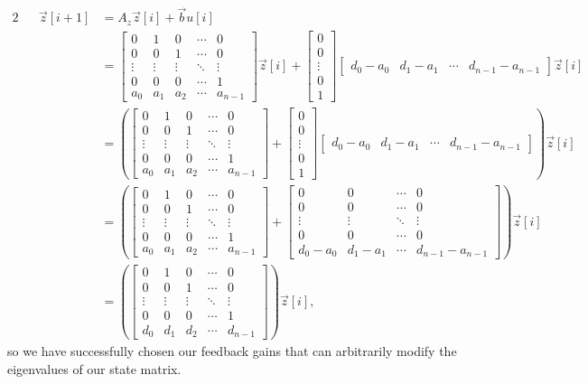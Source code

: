 \documentclass[letterpaper]{article}
\theoremstyle{remark}
\newcommand{\mat}[1]{\ensuremath{\begin{bmatrix}#1\end{bmatrix}}}
\newcommand{\eqn}[1]{\begin{alignat*}{2}#1\end{alignat*}}
\begin{document}
\eqn{
    && \vec{z}[i + 1] &= A_z \vec{z}[i] + \vec{b}u[i] \\
    &&&= \mat{
    0 & 1 & 0 & \cdots & 0 \\ 
    0 & 0 & 1 & \cdots & 0 \\
    \vdots & \vdots & \vdots & \ddots & \vdots \\
    0 & 0 & 0 & \cdots & 1 \\
    a_0 & a_1 & a_2 & \cdots & a_{n - 1}
    } \vec{z}[i] + \mat{0 \\ 0 \\ \vdots \\ 0 \\ 1} \mat{d_0 - a_0 & d_1 - a_1 & \cdots & d_{n-1} - a_{n-1}} \vec{z}[i] \\
    &&&= \left(
    \mat{
    0 & 1 & 0 & \cdots & 0 \\ 
    0 & 0 & 1 & \cdots & 0 \\
    \vdots & \vdots & \vdots & \ddots & \vdots \\
    0 & 0 & 0 & \cdots & 1 \\
    a_0 & a_1 & a_2 & \cdots & a_{n - 1}
    } + \mat{0 \\ 0 \\ \vdots \\ 0 \\ 1} \mat{d_0 - a_0 & d_1 - a_1 & \cdots & d_{n-1} - a_{n-1}} \right) \vec{z}[i]\\
    &&&= \left(
    \mat{
    0 & 1 & 0 & \cdots & 0 \\ 
    0 & 0 & 1 & \cdots & 0 \\
    \vdots & \vdots & \vdots & \ddots & \vdots \\
    0 & 0 & 0 & \cdots & 1 \\
    a_0 & a_1 & a_2 & \cdots & a_{n - 1}
    } + 
    \mat{
    0 & 0 & \cdots & 0 \\
    0 & 0 & \cdots & 0 \\
    \vdots & \vdots & \ddots & \vdots \\
    0 & 0 & \cdots & 0 \\
    d_0 - a_0 & d_1 - a_1 & \cdots & d_{n-1} - a_{n-1}
    }
    \right) \vec{z}[i] \\
    &&&= \left(
    \mat{
    0 & 1 & 0 & \cdots & 0 \\ 
    0 & 0 & 1 & \cdots & 0 \\
    \vdots & \vdots & \vdots & \ddots & \vdots \\
    0 & 0 & 0 & \cdots & 1 \\
    d_0 & d_1 & d_2 & \cdots & d_{n - 1}
    } \right) \vec{z}[i],
}
so we have successfully chosen our feedback gains that can arbitrarily modify the eigenvalues of our state matrix.
\end{document}
